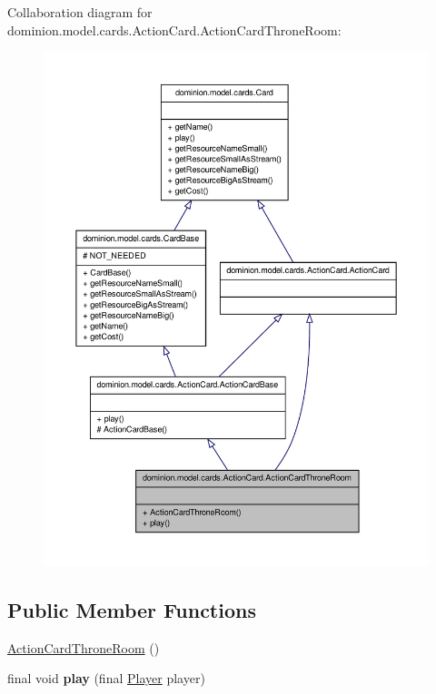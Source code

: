 \-Collaboration diagram for dominion.\-model.\-cards.\-Action\-Card.\-Action\-Card\-Throne\-Room\-:
\nopagebreak
\begin{figure}[H]
\begin{center}
\leavevmode
\includegraphics[width=350pt]{classdominion_1_1model_1_1cards_1_1ActionCard_1_1ActionCardThroneRoom__coll__graph}
\end{center}
\end{figure}
\subsection*{\-Public \-Member \-Functions}
\begin{DoxyCompactItemize}
\item 
\hyperlink{classdominion_1_1model_1_1cards_1_1ActionCard_1_1ActionCardThroneRoom_ab332f95c6ecaf9007ccb6b299bf8ab99}{\-Action\-Card\-Throne\-Room} ()
\item 
\hypertarget{classdominion_1_1model_1_1cards_1_1ActionCard_1_1ActionCardThroneRoom_a2a8c64565a07a1fe5d7b2c81fc0617e4}{final void {\bfseries play} (final \hyperlink{interfacedominion_1_1model_1_1Player}{\-Player} player)}\label{classdominion_1_1model_1_1cards_1_1ActionCard_1_1ActionCardThroneRoom_a2a8c64565a07a1fe5d7b2c81fc0617e4}

\end{DoxyCompactItemize}


